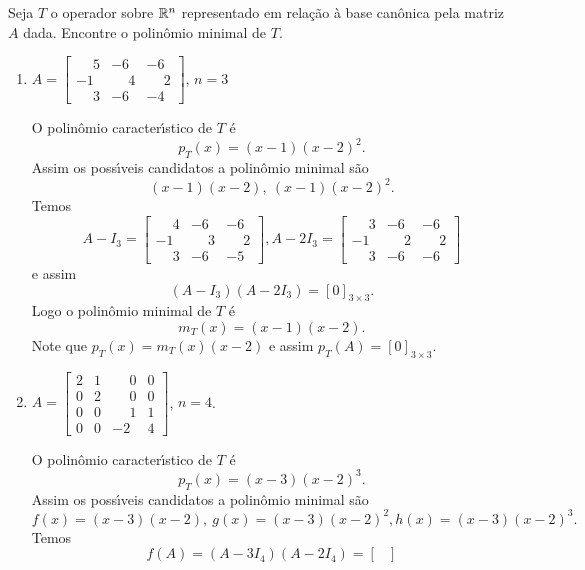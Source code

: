 \begin{exemplo}
	Seja $T$ o operador sobre $\mathbb{R}^n$ representado em rela\c{c}\~ao \`a base can\^onica pela matriz $A$ dada. Encontre o polin\^omio minimal de $T$.
	\begin{enumerate}
		\item $A = \begin{bmatrix}
			\phantom{-}5 & -6 & -6\\
			-1 & \phantom{-}4 & \phantom{-}2\\
			\phantom{-}3 & -6 & -4
		\end{bmatrix}$, $n = 3$
		\begin{solucao}
			O polin\^omio caracter{\'\i}stico de $T$ \'e
			\[
				p_T(x) = (x - 1)(x - 2)^2.
			\]
			Assim os poss{\'\i}veis candidatos a polin\^omio minimal s\~ao
			\[
				(x - 1)(x - 2), \ (x -1)(x - 2)^2.
			\]
			Temos
			\[
				A - I_3 = \begin{bmatrix}
					\phantom{-}4 & -6 & -6\\
					-1 & \phantom{-}3 & \phantom{-}2\\
					\phantom{-}3 & -6 & -5
				\end{bmatrix},
				A - 2I_3 = \begin{bmatrix}
					\phantom{-}3 & -6 & -6\\
					-1 & \phantom{-}2 & \phantom{-}2\\
					\phantom{-}3 & -6 & -6
				\end{bmatrix}
			\]
			e assim
			\[
				(A - I_3)(A - 2I_3) = [0]_{3 \times 3}.
			\]
			Logo o polin\^omio minimal de $T$ \'e
			\[
				m_T(x) = (x - 1)(x - 2).
			\]
			Note que $p_T(x) = m_T(x)(x - 2)$ e assim $p_T(A) = [0]_{3 \times 3}$.
		\end{solucao}
		\item $A = \begin{bmatrix}
			2 & 1 & \phantom{-}0 & 0\\
			0 & 2 & \phantom{-}0 & 0\\
			0 & 0 & \phantom{-}1 & 1\\
			0 & 0 & -2 & 4
		\end{bmatrix}$, $n = 4$.
		\begin{solucao}
			O polin\^omio caracter{\'\i}stico de $T$ \'e
			\[
				p_T(x) = (x - 3)(x - 2)^3.
			\]
			Assim os poss{\'\i}veis candidatos a polin\^omio minimal s\~ao
			\[
				f(x) = (x - 3)(x - 2), \ g(x) = (x -3)(x - 2)^2, h(x) = (x - 3)(x - 2)^3.
			\]
			Temos
			\[
				f(A) = (A - 3I_4)(A - 2I_4) = \begin{bmatrix}

\end{bmatrix}\]
\end{solucao}
\end{enumerate}
\end{exemplo}
